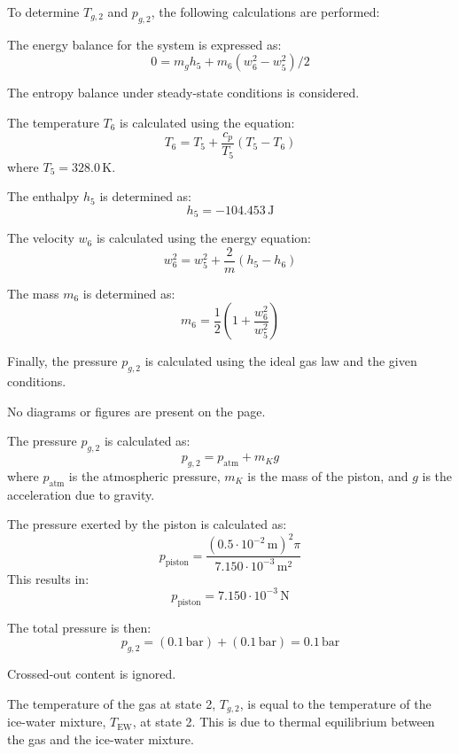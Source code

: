 To determine \( T_{g,2} \) and \( p_{g,2} \), the following calculations are performed:  

The energy balance for the system is expressed as:  
\[
0 = m_g h_5 + m_6 \left( w_6^2 - w_5^2 \right) / 2
\]  

The entropy balance under steady-state conditions is considered.  

The temperature \( T_6 \) is calculated using the equation:  
\[
T_6 = T_5 + \frac{c_p}{T_5} \left( T_5 - T_6 \right)
\]  
where \( T_5 = 328.0 \, \text{K} \).  

The enthalpy \( h_5 \) is determined as:  
\[
h_5 = -104.453 \, \text{J}
\]  

The velocity \( w_6 \) is calculated using the energy equation:  
\[
w_6^2 = w_5^2 + \frac{2}{m} \left( h_5 - h_6 \right)
\]  

The mass \( m_6 \) is determined as:  
\[
m_6 = \frac{1}{2} \left( 1 + \frac{w_6^2}{w_5^2} \right)
\]  

Finally, the pressure \( p_{g,2} \) is calculated using the ideal gas law and the given conditions.  

No diagrams or figures are present on the page.

The pressure \( p_{g,2} \) is calculated as:  
\[
p_{g,2} = p_{\text{atm}} + m_K g
\]  
where \( p_{\text{atm}} \) is the atmospheric pressure, \( m_K \) is the mass of the piston, and \( g \) is the acceleration due to gravity.  

The pressure exerted by the piston is calculated as:  
\[
p_{\text{piston}} = \frac{(0.5 \cdot 10^{-2} \, \text{m})^2 \pi}{7.150 \cdot 10^{-3} \, \text{m}^2}
\]  
This results in:  
\[
p_{\text{piston}} = 7.150 \cdot 10^{-3} \, \text{N}
\]  

The total pressure is then:  
\[
p_{g,2} = (0.1 \, \text{bar}) + (0.1 \, \text{bar}) = 0.1 \, \text{bar}
\]  

Crossed-out content is ignored.

The temperature of the gas at state 2, \( T_{g,2} \), is equal to the temperature of the ice-water mixture, \( T_{\text{EW}} \), at state 2. This is due to thermal equilibrium between the gas and the ice-water mixture.